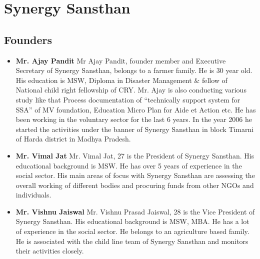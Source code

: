 
\chapter{Synergy Sansthan}
\ifpdf
    \graphicspath{{Chapter1/Chapter1Figs/PNG/}{Chapter1/Chapter1Figs/PDF/}{Chapter1/Chapter1Figs/}}
\else
    \graphicspath{{Chapter1/Chapter1Figs/EPS/}{Chapter1/Chapter1Figs/}}
\fi

\section{Founders}
\begin{itemize}
	\item \textbf{Mr. Ajay Pandit} \newline
		Mr Ajay Pandit, founder member and Executive Secretary of Synergy Sansthan, belongs to a farmer family. He is 30 year old. His education is MSW, Diploma in Disaster Management \& fellow of National child right fellowship of CRY. Mr. Ajay is also conducting various study like that Process documentation of ``technically support system for SSA'' of MV foundation, Education Micro Plan for Aide et Action etc. He has been working in the voluntary sector for the last 6 years. In the year 2006 he started the activities under the banner of Synergy Sansthan in block Timarni of Harda district in Madhya Pradesh.
	\item \textbf{Mr. Vimal Jat} \newline
		Mr. Vimal Jat, 27 is the President of Synergy Sansthan. His educational background is MSW. He has over 5 years of experience in the social sector. His main areas of focus with Synergy Sansthan are assessing the overall working of different bodies and procuring funds from other NGOs and individuals.
	\item \textbf{Mr. Vishnu Jaiswal} \newline
		Mr. Vishnu Prasad Jaiswal, 28 is the Vice President of Synergy Sansthan. His educational background is MSW,  MBA. He has a lot of experience in the social sector. He belongs to an agriculture based family. He is associated with the child line team of Synergy Sansthan and monitors their activities closely.
\end{itemize}

